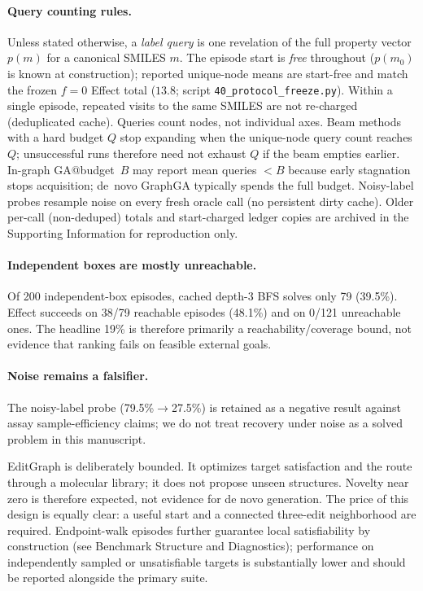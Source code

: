 \paragraph{Query counting rules.}
Unless stated otherwise, a \emph{label query} is one revelation of the full property vector $p(m)$ for a canonical SMILES $m$. The episode start is \emph{free} throughout ($p(m_0)$ is known at construction); reported unique-node means are start-free and match the frozen $f{=}0$ Effect total ($13.8$; script \texttt{40\_protocol\_freeze.py}). Within a single episode, repeated visits to the same SMILES are not re-charged (deduplicated cache). Queries count nodes, not individual axes. Beam methods with a hard budget $Q$ stop expanding when the unique-node query count reaches $Q$; unsuccessful runs therefore need not exhaust $Q$ if the beam empties earlier. In-graph GA@budget~$B$ may report mean queries $<B$ because early stagnation stops acquisition; de~novo GraphGA typically spends the full budget. Noisy-label probes resample noise on every fresh oracle call (no persistent dirty cache). Older per-call (non-deduped) totals and start-charged ledger copies are archived in the Supporting Information for reproduction only.

\paragraph{Independent boxes are mostly unreachable.}
Of 200 independent-box episodes, cached depth-3 BFS solves only 79 (39.5\%). Effect succeeds on 38/79 reachable episodes (48.1\%) and on 0/121 unreachable ones. The headline 19\% is therefore primarily a reachability/coverage bound, not evidence that ranking fails on feasible external goals.

\paragraph{Noise remains a falsifier.}
The noisy-label probe (79.5\%$\to$27.5\%) is retained as a negative result against assay sample-efficiency claims; we do not treat recovery under noise as a solved problem in this manuscript.

EditGraph is deliberately bounded. It optimizes target satisfaction and the route through a molecular library; it does not propose unseen structures. Novelty near zero is therefore expected, not evidence for de novo generation. The price of this design is equally clear: a useful start and a connected three-edit neighborhood are required. Endpoint-walk episodes further guarantee local satisfiability by construction (see Benchmark Structure and Diagnostics); performance on independently sampled or unsatisfiable targets is substantially lower and should be reported alongside the primary suite.


